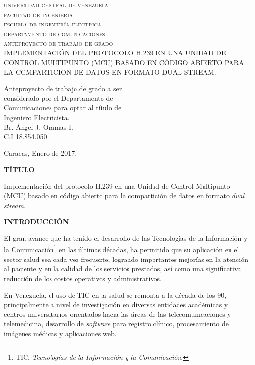 \documentclass[12pt,letterpaper]{article}
\begin{document}
		

\begin{titlepage}	
\begin{center}
\textsc{universidad central de venezuela\\facultad de ingeniería\\escuela de ingeniería eléctrica\\departamento de comunicaciones\\anteproyecto de trabajo de grado\\}
\vspace*{5cm}
IMPLEMENTACIÓN DEL PROTOCOLO H.239 EN UNA UNIDAD DE CONTROL MULTIPUNTO (MCU) BASADO EN CÓDIGO ABIERTO PARA LA COMPARTICION DE DATOS EN FORMATO DUAL STREAM.
\end{center}
\vspace*{4cm}

\begin{flushright}
{\footnotesize Anteproyecto de trabajo de grado a ser\\considerado por el Departamento de\\Comunicaciones para optar al título de\\Ingeniero Electricista.}\\
\vspace*{1cm}Br. Ángel J. Oramas I.\\C.I 18.854.050
\end{flushright}

\vfill \centerline {Caracas, Enero de 2017.}	
\end{titlepage}

\newpage
\centerline{\textbf{TÍTULO}}

Implementación del protocolo H.239 en una Unidad de Control Multipunto (MCU) basado en código abierto para la compartición de datos en formato \emph{dual stream}.

\centerline{\textbf{INTRODUCCIÓN}}

El gran avance que ha tenido el desarrollo de las Tecnologías de la Información y la Comunicación\footnote{TIC. \emph{Tecnologías de la Información y la Comunicación}.} en las últimas décadas, ha permitido que su aplicación en el sector salud sea cada vez frecuente, logrando importantes mejorías en la atención al paciente y en la calidad de los servicios prestados, así como una significativa reducción de los costos  operativos y administrativos.

En Venezuela, el uso de TIC en la salud se remonta a la década de los 90, principalmente a nivel de investigación en diversas entidades académicas y centros universitarios orientados hacia las  áreas de las telecomunicaciones y telemedicina, desarrollo de \emph{software} para registro clínico, procesamiento de imágenes médicas y aplicaciones web.
\end{document}
